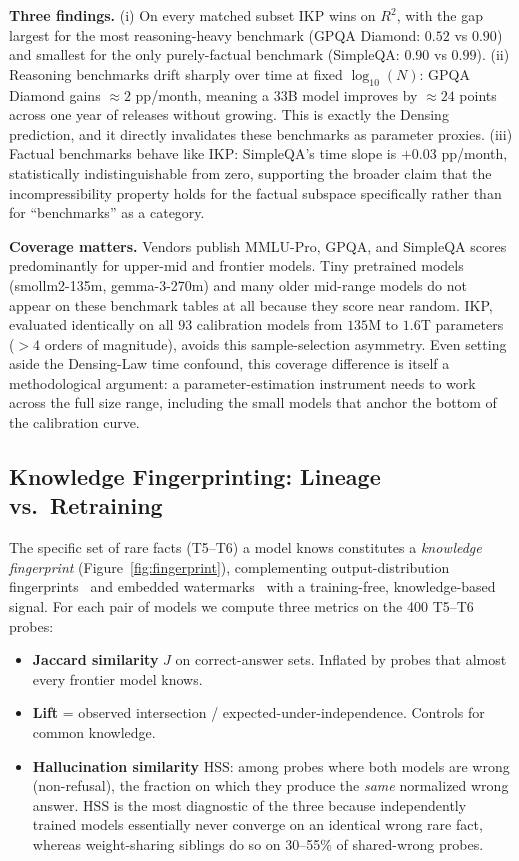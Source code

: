 \documentclass[11pt]{article}
\begin{document}
\textbf{Three findings.} (i) On every matched subset IKP wins on $R^2$, with the gap largest for the most reasoning-heavy benchmark (GPQA Diamond: $0.52$ vs $0.90$) and smallest for the only purely-factual benchmark (SimpleQA: $0.90$ vs $0.99$). (ii) Reasoning benchmarks drift sharply over time at fixed $\log_{10}(N)$: GPQA Diamond gains $\approx 2$ pp/month, meaning a $33$B model improves by $\approx 24$ points across one year of releases without growing. This is exactly the Densing prediction, and it directly invalidates these benchmarks as parameter proxies. (iii) Factual benchmarks behave like IKP: SimpleQA's time slope is $+0.03$ pp/month, statistically indistinguishable from zero, supporting the broader claim that the incompressibility property holds for the factual subspace specifically rather than for ``benchmarks'' as a category.

\textbf{Coverage matters.} Vendors publish MMLU-Pro, GPQA, and SimpleQA scores predominantly for upper-mid and frontier models. Tiny pretrained models (smollm2-135m, gemma-3-270m) and many older mid-range models do not appear on these benchmark tables at all because they score near random. IKP, evaluated identically on all $93$ calibration models from $135$M to $1.6$T parameters ($> 4$ orders of magnitude), avoids this sample-selection asymmetry. Even setting aside the Densing-Law time confound, this coverage difference is itself a methodological argument: a parameter-estimation instrument needs to work across the full size range, including the small models that anchor the bottom of the calibration curve.

\subsection{Knowledge Fingerprinting: Lineage vs.\ Retraining}
\label{sec:fingerprint}

The specific set of rare facts (T5--T6) a model knows constitutes a \emph{knowledge fingerprint} (Figure~\ref{fig:fingerprint}), complementing output-distribution fingerprints~\citep{tsai2025rofl} and embedded watermarks~\citep{nasery2025fingerprinting} with a training-free, knowledge-based signal. For each pair of models we compute three metrics on the 400 T5--T6 probes:

\begin{itemize}[leftmargin=*]
    \item \textbf{Jaccard similarity} $J$ on correct-answer sets. Inflated by probes that almost every frontier model knows.
    \item \textbf{Lift} = observed intersection / expected-under-independence. Controls for common knowledge.
    \item \textbf{Hallucination similarity} $\mathrm{HSS}$: among probes where both models are wrong (non-refusal), the fraction on which they produce the \emph{same} normalized wrong answer. $\mathrm{HSS}$ is the most diagnostic of the three because independently trained models essentially never converge on an identical wrong rare fact, whereas weight-sharing siblings do so on 30--55\% of shared-wrong probes.
\end{itemize}
\end{document}
